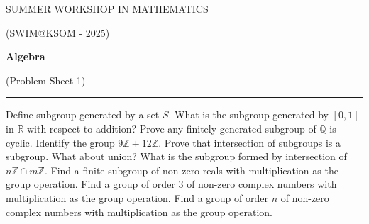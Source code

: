 \documentclass[fleqn]{exam}
\begin{document}
\begin{center}
	{\huge SUMMER WORKSHOP IN MATHEMATICS}
	
	\bigskip
	
	{\large (SWIM@KSOM - 2025)}
	
	\bigskip


	\textbf{\Large Algebra}
	
	\medskip

	{\large (Problem Sheet 1)}

	\medskip
	
	\hrule
\end{center}

\begin{questions}
	\question Define subgroup generated by a set $S$. What is the subgroup generated by $[0, 1]$ in $\mathbb{R}$ with respect to addition?
	\question Prove any finitely generated subgroup of $\mathbb{Q}$ is cyclic.
	\question Identify the group $9\mathbb{Z}+12\mathbb{Z}$.
	\question Prove that intersection of subgroups is a subgroup. What about union?
	\question What is the subgroup formed by intersection of $n\mathbb{Z}\cap m\mathbb{Z}$.
	\question Find a finite subgroup of non-zero reals with multiplication as the group operation.
	\question Find a group of order 3 of non-zero complex numbers with multiplication as the group operation.
	\question Find a group of order $n$ of non-zero complex numbers with multiplication as the group operation.
\end{questions}
\end{document}
